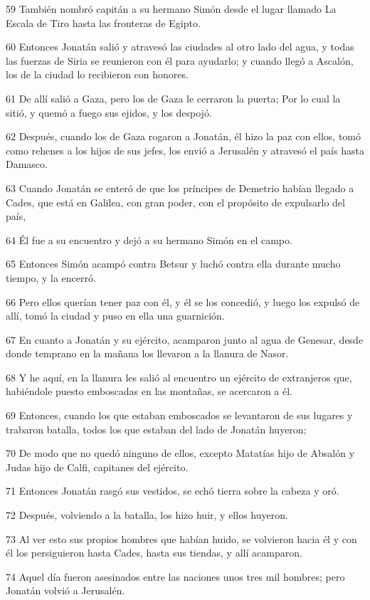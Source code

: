 \par 59 También nombró capitán a su hermano Simón desde el lugar llamado La Escala de Tiro hasta las fronteras de Egipto.
\par 60 Entonces Jonatán salió y atravesó las ciudades al otro lado del agua, y todas las fuerzas de Siria se reunieron con él para ayudarlo; y cuando llegó a Ascalón, los de la ciudad lo recibieron con honores.
\par 61 De allí salió a Gaza, pero los de Gaza le cerraron la puerta; Por lo cual la sitió, y quemó a fuego sus ejidos, y los despojó.
\par 62 Después, cuando los de Gaza rogaron a Jonatán, él hizo la paz con ellos, tomó como rehenes a los hijos de sus jefes, los envió a Jerusalén y atravesó el país hasta Damasco.
\par 63 Cuando Jonatán se enteró de que los príncipes de Demetrio habían llegado a Cades, que está en Galilea, con gran poder, con el propósito de expulsarlo del país,
\par 64 Él fue a su encuentro y dejó a su hermano Simón en el campo.
\par 65 Entonces Simón acampó contra Betsur y luchó contra ella durante mucho tiempo, y la encerró.
\par 66 Pero ellos querían tener paz con él, y él se los concedió, y luego los expulsó de allí, tomó la ciudad y puso en ella una guarnición.
\par 67 En cuanto a Jonatán y su ejército, acamparon junto al agua de Genesar, desde donde temprano en la mañana los llevaron a la llanura de Nasor.
\par 68 Y he aquí, en la llanura les salió al encuentro un ejército de extranjeros que, habiéndole puesto emboscadas en las montañas, se acercaron a él.
\par 69 Entonces, cuando los que estaban emboscados se levantaron de sus lugares y trabaron batalla, todos los que estaban del lado de Jonatán huyeron;
\par 70 De modo que no quedó ninguno de ellos, excepto Matatías hijo de Absalón y Judas hijo de Calfi, capitanes del ejército.
\par 71 Entonces Jonatán rasgó sus vestidos, se echó tierra sobre la cabeza y oró.
\par 72 Después, volviendo a la batalla, los hizo huir, y ellos huyeron.
\par 73 Al ver esto sus propios hombres que habían huido, se volvieron hacia él y con él los persiguieron hasta Cades, hasta sus tiendas, y allí acamparon.
\par 74 Aquel día fueron asesinados entre las naciones unos tres mil hombres; pero Jonatán volvió a Jerusalén.

